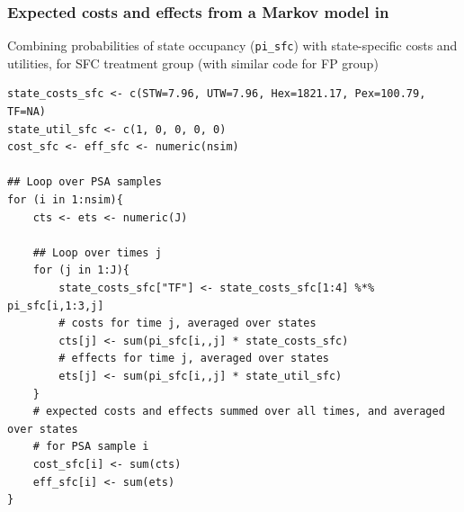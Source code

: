 \begin{frame}[fragile]

\frametitle{Expected costs and effects from a Markov model in \R}

Combining probabilities of state occupancy (\texttt{pi\_sfc}) with state-specific costs and utilities, for SFC treatment group (with similar code for FP group)

{\footnotesize \olive
\begin{verbatim}
state_costs_sfc <- c(STW=7.96, UTW=7.96, Hex=1821.17, Pex=100.79, TF=NA)
state_util_sfc <- c(1, 0, 0, 0, 0)
cost_sfc <- eff_sfc <- numeric(nsim)

## Loop over PSA samples
for (i in 1:nsim){
    cts <- ets <- numeric(J)

    ## Loop over times j
    for (j in 1:J){
        state_costs_sfc["TF"] <- state_costs_sfc[1:4] %*% pi_sfc[i,1:3,j]
        # costs for time j, averaged over states
        cts[j] <- sum(pi_sfc[i,,j] * state_costs_sfc) 
        # effects for time j, averaged over states
        ets[j] <- sum(pi_sfc[i,,j] * state_util_sfc)  
    }
    # expected costs and effects summed over all times, and averaged over states
    # for PSA sample i
    cost_sfc[i] <- sum(cts) 
    eff_sfc[i] <- sum(ets) 
}
\end{verbatim}
}






\end{frame}


